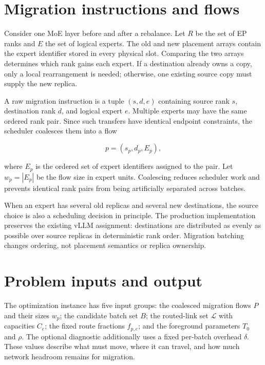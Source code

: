 \label{ch:formulation}

\section{Migration instructions and flows}

Consider one MoE layer before and after a rebalance. Let $R$ be the set of EP
ranks and $E$ the set of logical experts. The old and new placement arrays
contain the expert identifier stored in every physical slot. Comparing the two
arrays determines which rank gains each expert. If a destination already owns
a copy, only a local rearrangement is needed; otherwise, one existing source
copy must supply the new replica.

A raw migration instruction is a tuple $(s,d,e)$ containing source rank $s$,
destination rank $d$, and logical expert $e$. Multiple experts may have the
same ordered rank pair. Since such transfers have identical endpoint
constraints, the scheduler coalesces them into a flow

\begin{equation}
  p=(s_p,d_p,E_p),
\end{equation}

where $E_p$ is the ordered set of expert identifiers assigned to the pair. Let
$w_p=|E_p|$ be the flow size in expert units. Coalescing reduces scheduler work
and prevents identical rank pairs from being artificially separated across
batches.

When an expert has several old replicas and several new destinations, the
source choice is also a scheduling decision in principle. The production
implementation preserves the existing vLLM assignment: destinations are
distributed as evenly as possible over source replicas in deterministic rank
order. Migration batching changes ordering, not placement semantics or replica
ownership.

\section{Problem inputs and output}

The optimization instance has five input groups: the coalesced migration flows
$P$ and their sizes $w_p$; the candidate batch set $B$; the routed-link set
$\mathcal{L}$ with capacities $C_e$; the fixed route fractions $f_{p,e}$; and
the foreground parameters $T_0$ and $\rho$. The optional diagnostic additionally
uses a fixed per-batch overhead $\delta$. These values describe what must move,
where it can travel, and how much network headroom remains for migration.

